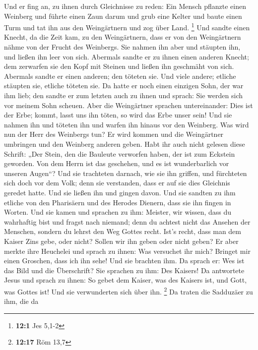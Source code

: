 Und er fing an, zu ihnen durch Gleichnisse zu reden: Ein
Mensch pflanzte einen Weinberg und führte einen Zaun darum und grub eine
Kelter und baute einen Turm und tat ihn aus den Weingärtnern und zog
über Land. \footnote{\textbf{12:1} Jes 5,1-2}  Und sandte
einen Knecht, da die Zeit kam, zu den Weingärtnern, dass er von den
Weingärtnern nähme von der Frucht des Weinbergs.  Sie
nahmen ihn aber und stäupten ihn, und ließen ihn leer von sich.
 Abermals sandte er zu ihnen einen anderen Knecht; dem
zerwarfen sie den Kopf mit Steinen und ließen ihn geschmäht von sich.
 Abermals sandte er einen anderen; den töteten sie. Und
viele andere; etliche stäupten sie, etliche töteten sie. 
Da hatte er noch einen einzigen Sohn, der war ihm lieb; den sandte er
zum letzten auch zu ihnen und sprach: Sie werden sich vor meinem Sohn
scheuen.  Aber die Weingärtner sprachen untereinander:
Dies ist der Erbe; kommt, lasst uns ihn töten, so wird das Erbe unser
sein!  Und sie nahmen ihn und töteten ihn und warfen ihn
hinaus vor den Weinberg.  Was wird nun der Herr des
Weinbergs tun? Er wird kommen und die Weingärtner umbringen und den
Weinberg anderen geben.  Habt ihr auch nicht gelesen
diese Schrift: „Der Stein, den die Bauleute verworfen haben, der ist zum
Eckstein geworden.  Von dem Herrn ist das geschehen, und
es ist wunderbarlich vor unseren Augen``?  Und sie
trachteten darnach, wie sie ihn griffen, und fürchteten sich doch vor
dem Volk; denn sie verstanden, dass er auf sie dies Gleichnis geredet
hatte. Und sie ließen ihn und gingen davon.  Und sie
sandten zu ihm etliche von den Pharisäern und des Herodes Dienern, dass
sie ihn fingen in Worten.  Und sie kamen und sprachen zu
ihm: Meister, wir wissen, dass du wahrhaftig bist und fragst nach
niemand; denn du achtest nicht das Ansehen der Menschen, sondern du
lehrst den Weg Gottes recht. Ist's recht, dass man dem Kaiser Zins gebe,
oder nicht? Sollen wir ihn geben oder nicht geben?  Er
aber merkte ihre Heuchelei und sprach zu ihnen: Was versuchet ihr mich?
Bringet mir einen Groschen, dass ich ihn sehe!  Und sie
brachten ihm. Da sprach er: Wes ist das Bild und die Überschrift? Sie
sprachen zu ihm: Des Kaisers!  Da antwortete Jesus und
sprach zu ihnen: So gebet dem Kaiser, was des Kaisers ist, und Gott, was
Gottes ist! Und sie verwunderten sich über ihn. \footnote{\textbf{12:17}
  Röm 13,7}  Da traten die Sadduzäer zu ihm, die da

